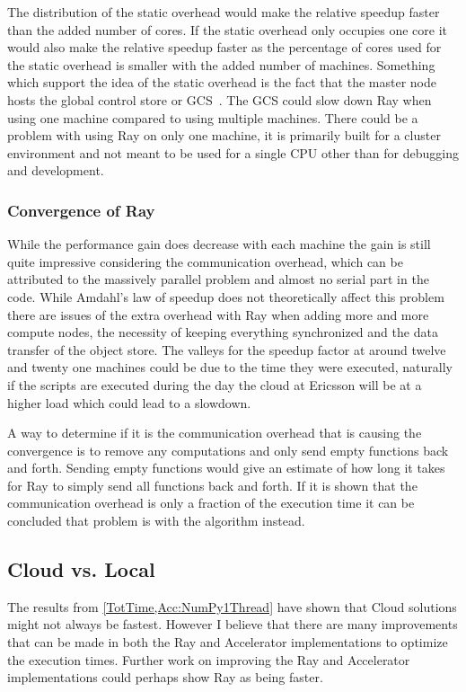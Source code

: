 \documentclass[12pt, a4paper]{article}
\begin{document}
The distribution of the static overhead would make the relative speedup faster than the added number of cores.
If the static overhead only occupies one core it would also make the relative speedup faster as the percentage of cores used for the static overhead is smaller with the added number of machines.
Something which support the idea of the static overhead is the fact that the master node hosts the global control store or GCS~\cite{ray:rayCluster,ray:GCS, ray:Architecture}.
The GCS could slow down Ray when using one machine compared to using multiple machines.
There could be a problem with using Ray on only one machine, it is primarily built for a cluster environment and not meant to be used for a single CPU other than for debugging and development.

\subsubsection{Convergence of Ray}\label{rayConvergence}

While the performance gain does decrease with each machine the gain is still quite impressive considering the communication overhead, which can be attributed to the massively parallel problem and almost no serial part in the code.
While Amdahl's law of speedup does not theoretically affect this problem there are issues of the extra overhead with Ray when adding more and more compute nodes, the necessity of keeping everything synchronized and the data transfer of the object store.
The valleys for the speedup factor at around twelve and twenty one machines could be due to the time they were executed, naturally if the scripts are executed during the day the cloud at Ericsson will be at a higher load which could lead to a slowdown.

A way to determine if it is the communication overhead that is causing the convergence is to remove any computations and only send empty functions back and forth.
Sending empty functions would give an estimate of how long it takes for Ray to simply send all functions back and forth.
If it is shown that the communication overhead is only a fraction of the execution time it can be concluded that problem is with the algorithm instead.

\subsection{Cloud vs. Local}

The results from \cref{TotTime,Acc:NumPy1Thread} have shown that Cloud solutions might not always be fastest.
However I believe that there are many improvements that can be made in both the Ray and Accelerator implementations to optimize the execution times.
Further work on improving the Ray and Accelerator implementations could perhaps show Ray as being faster.
\end{document}
